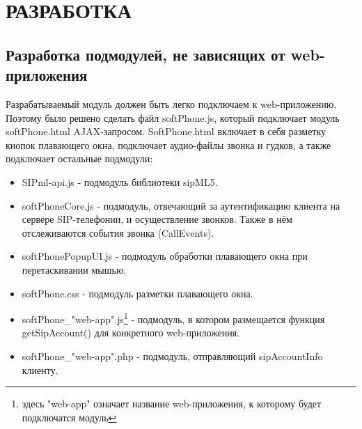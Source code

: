 \chapter{РАЗРАБОТКА}

\section{Разработка подмодулей, не зависящих от web-приложения}

Разрабатываемый модуль должен быть легко подключаем к web-приложению. Поэтому было решено сделать файл softPhone.js, который подключает модуль softPhone.html AJAX-запросом. SoftPhone.html включает в себя разметку кнопок плавающего окна, подключает аудио-файлы звонка и гудков, а также подключает остальные подмодули:
\begin{itemize}
\item SIPml-api.js - подмодуль библиотеки sipML5.
\item softPhoneCore.js - подмодуль, отвечающий за аутентификацию клиента на сервере SIP-телефонии, и осуществление звонков. Также в нём отслеживаются события звонка (CallEvents).
\item softPhonePopupUI.js - подмодуль обработки плавающего окна при перетаскивании мышью.
\item softPhone.css - подмодуль разметки плавающего окна.
\item softPhone\_"web-app".js\footnote{здесь "web-app" означает название web-приложения, к которому будет подключатся модуль} - подмодуль, в котором размещается функция getSipAccount() для конкретного web-приложения.
\item softPhone\_"web-app".php - подмодуль, отправляющий sipAccountInfo клиенту.
\end{itemize}

